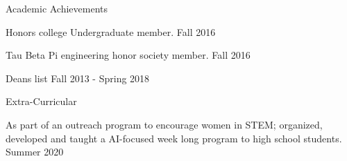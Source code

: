 \documentclass{resume}
\begin{document}
% 
\begin{rSection}{Academic Achievements} 
\item Honors college Undergraduate member. \hfill Fall 2016
\item Tau Beta Pi engineering honor society member. \hfill Fall 2016
\item Deans list \hfill Fall 2013 - Spring 2018
\end{rSection}

\begin{rSection}{Extra-Curricular} 
\item As part of an outreach program to encourage women in STEM; organized, developed and taught a AI-focused week long program to high school students. \hfill Summer 2020
\end{rSection}
\end{document}
